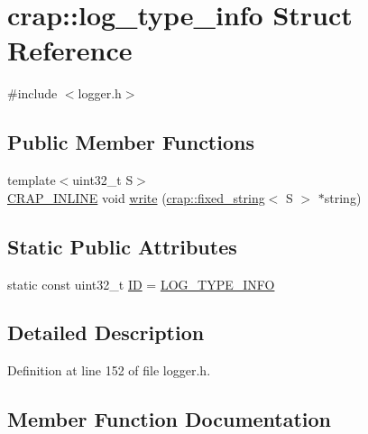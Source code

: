 \hypertarget{structcrap_1_1log__type__info}{}\section{crap\+:\+:log\+\_\+type\+\_\+info Struct Reference}
\label{structcrap_1_1log__type__info}


{\ttfamily \#include $<$logger.\+h$>$}

\subsection*{Public Member Functions}
\begin{DoxyCompactItemize}
\item 
{\footnotesize template$<$uint32\+\_\+t S$>$ }\\\hyperlink{config__x86_8h_a5a40526b8d842e7ff731509998bb0f1c}{C\+R\+A\+P\+\_\+\+I\+N\+L\+I\+N\+E} void \hyperlink{structcrap_1_1log__type__info_ade1f38f5e14847c98ccbbdc2fb2305b2}{write} (\hyperlink{classcrap_1_1fixed__string}{crap\+::fixed\+\_\+string}$<$ S $>$ $\ast$string)
\end{DoxyCompactItemize}
\subsection*{Static Public Attributes}
\begin{DoxyCompactItemize}
\item 
static const uint32\+\_\+t \hyperlink{structcrap_1_1log__type__info_a6b5efdde42f7d1204fdefb9b70816a91}{I\+D} = \hyperlink{logger_8h_a8b181b7eaaab11e988e2c6b7cdc0d80a}{L\+O\+G\+\_\+\+T\+Y\+P\+E\+\_\+\+I\+N\+F\+O}
\end{DoxyCompactItemize}


\subsection{Detailed Description}


Definition at line 152 of file logger.\+h.



\subsection{Member Function Documentation}
\hypertarget{structcrap_1_1log__type__info_ade1f38f5e14847c98ccbbdc2fb2305b2}{}
